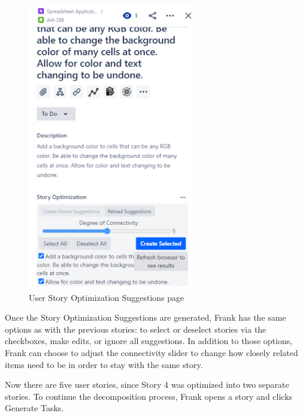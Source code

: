 \begin{figure}
\centerline{\includegraphics[width=0.65\textwidth,height=0.65\textheight,keepaspectratio]{./figure/Scenario1Figure3.png}}
\caption{User Story Optimization Suggestions page}
\end{figure}

Once the Story Optimization Suggestions are generated, Frank has the same options as with the previous stories: to select or deselect stories via the checkboxes, make edits, or ignore all suggestions. In addition to those options, Frank can choose to adjust the connectivity slider to change how closely related items need to be in order to stay with the same story.  

Now there are five user stories, since Story 4 was optimized into two separate stories. To continue the decomposition process, Frank opens a story and clicks Generate Tasks.

